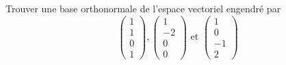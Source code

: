 \begin{example}
\label{exe:7}
Trouver une base orthonormale de l'espace vectoriel engendré par 
\begin{displaymath}
  \begin{pmatrix}
    1\\1\\0\\1
  \end{pmatrix}, 
  \begin{pmatrix}
    1\\-2\\0\\0
  \end{pmatrix}
  \text{ et } 
  \begin{pmatrix}
    1\\0\\-1\\2
  \end{pmatrix}
\end{displaymath}


\end{example}
